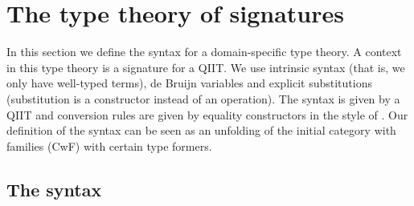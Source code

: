 \documentclass[acmsmall,review]{acmart}\settopmatter{printfolios=true,printccs=false,printacmref=false}
\begin{document}

\section{The type theory of signatures}
\label{sec:signatures}

In this section we define the syntax for a domain-specific type
theory. A context in this type theory is a signature for a QIIT. We
use intrinsic syntax (that is, we only have well-typed terms), de
Bruijn variables and explicit substitutions (substitution is a
constructor instead of an operation). The syntax is given by a QIIT
and conversion rules are given by equality constructors in the style
of \cite{ttintt}. Our definition of the syntax can be seen as an
unfolding of the initial category with families (CwF)
\cite{Dybjer96internaltype} with certain type formers.

\subsection{The syntax}
\label{sec:syntax}
\end{document}
